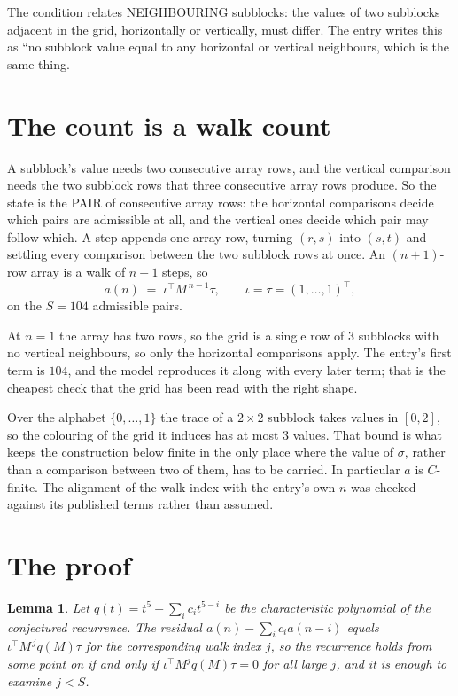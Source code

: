 \documentclass[11pt,a4paper]{article}
\theoremstyle{plain}
\newtheorem{lemma}[theorem]{Lemma}
\theoremstyle{definition}
\begin{document}
The condition relates NEIGHBOURING subblocks: the values of two subblocks adjacent in the grid,
horizontally or vertically, must differ. The entry writes this as ``no subblock value equal to any horizontal or vertical neighbours, which is the same thing.

\section{The count is a walk count}

A subblock's value needs two consecutive array rows, and the vertical
comparison needs the two subblock rows that three consecutive array rows produce. So the state
is the PAIR of consecutive array rows: the horizontal comparisons decide which pairs are
admissible at all, and the vertical ones decide which pair may follow which. A step appends one
array row, turning $(r,s)$ into $(s,t)$ and settling every comparison between the two subblock
rows at once. An $(n+1)$-row array is a walk of $n-1$ steps, so
\[
a(n)\;=\;\iota^{\!\top}M^{\,n-1}\tau,\qquad\iota=\tau=(1,\dots,1)^{\!\top},
\]
on the $S=104$ admissible pairs.

At $n=1$ the array has two rows, so the grid is a single row of $3$
subblocks with no vertical neighbours, so only the horizontal comparisons apply. The
entry's first term is $104$, and the model reproduces it along with every later term; that
is the cheapest check that the grid has been read with the right shape.

Over the alphabet $\{0,\dots,1\}$ the trace of a $2\times2$ subblock takes values in
$[0,2]$, so the colouring of the grid it induces has at most $3$ values.
That bound is what keeps the construction below finite in the only place where the value of
$\sigma$, rather than a comparison between two of them, has to be carried.
In particular $a$ is $C$-finite. The alignment of the walk index with the entry's own $n$ was
checked against its published terms rather than assumed.

\section{The proof}

\begin{lemma}\label{lem:crit}
Let $q(t)=t^{5}-\sum_i c_it^{5-i}$ be the characteristic polynomial of the
conjectured recurrence. The residual $a(n)-\sum_ic_ia(n-i)$ equals
$\iota^{\!\top}M^{\,j}q(M)\tau$ for the corresponding walk index $j$, so the recurrence
holds from some point on if and only if $\iota^{\!\top}M^{j}q(M)\tau=0$ for all large $j$,
and it is enough to examine $j<S$.
\end{lemma}
\end{document}
